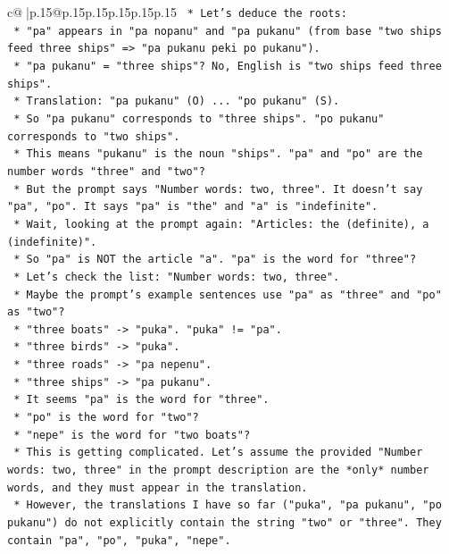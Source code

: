 \documentclass{article}
\begin{document}
{\begin{supertabular}{c@{$\;$}|p{.15\linewidth}@{}p{.15\linewidth}p{.15\linewidth}p{.15\linewidth}p{.15\linewidth}p{.15\linewidth}}
{{{\texttt{    *   Let's deduce the roots:} \\
\texttt{        *   "pa" appears in "pa nopanu" and "pa pukanu" (from base "two ships feed three ships" => "pa pukanu peki po pukanu").} \\
\texttt{            *   "pa pukanu" = "three ships"? No, English is "two ships feed three ships".} \\
\texttt{            *   Translation: "pa pukanu" (O) ... "po pukanu" (S).} \\
\texttt{            *   So "pa pukanu" corresponds to "three ships". "po pukanu" corresponds to "two ships".} \\
\texttt{            *   This means "pukanu" is the noun "ships". "pa" and "po" are the number words "three" and "two"?} \\
\texttt{            *   But the prompt says "Number words: two, three". It doesn't say "pa", "po". It says "pa" is "the" and "a" is "indefinite".} \\
\texttt{            *   Wait, looking at the prompt again: "Articles: the (definite), a (indefinite)".} \\
\texttt{            *   So "pa" is NOT the article "a". "pa" is the word for "three"?} \\
\texttt{            *   Let's check the list: "Number words: two, three".} \\
\texttt{            *   Maybe the prompt's example sentences use "pa" as "three" and "po" as "two"?} \\
\texttt{            *   "three boats" {-}> "puka". "puka" != "pa".} \\
\texttt{            *   "three birds" {-}> "puka".} \\
\texttt{            *   "three roads" {-}> "pa nepenu".} \\
\texttt{            *   "three ships" {-}> "pa pukanu".} \\
\texttt{            *   It seems "pa" is the word for "three".} \\
\texttt{            *   "po" is the word for "two"?} \\
\texttt{            *   "nepe" is the word for "two boats"?} \\
\texttt{            *   This is getting complicated. Let's assume the provided "Number words: two, three" in the prompt description are the *only* number words, and they must appear in the translation.} \\
\texttt{            *   However, the translations I have so far ("puka", "pa pukanu", "po pukanu") do not explicitly contain the string "two" or "three". They contain "pa", "po", "puka", "nepe".} \\
}}}
\end{supertabular}}
\end{document}
